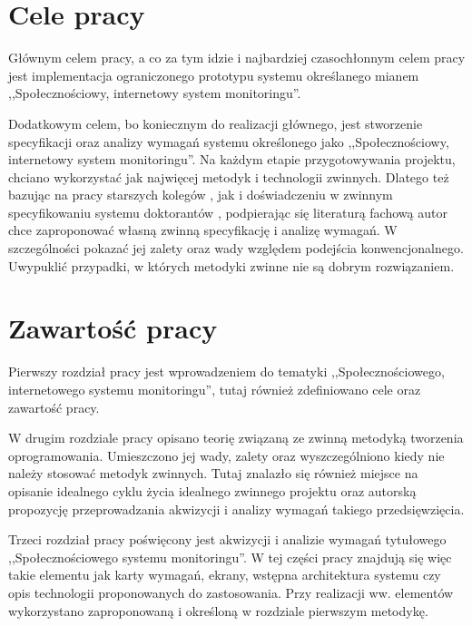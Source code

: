 \newpage

\section{Cele pracy}
\label{sec:celePracy}

Głównym celem pracy, a co za tym idzie i najbardziej czasochłonnym celem pracy jest implementacja ograniczonego prototypu systemu określanego mianem ,,Społecznościowy, internetowy system monitoringu''.

Dodatkowym celem, bo koniecznym do realizacji głównego, jest stworzenie specyfikacji oraz analizy wymagań systemu określonego jako ,,Społecznościowy, internetowy system monitoringu''. Na każdym etapie przygotowywania projektu, chciano wykorzystać jak najwięcej metodyk i technologii zwinnych. Dlatego też bazując na pracy starszych kolegów \cite{JakMich06}, jak i doświadczeniu w zwinnym specyfikowaniu systemu doktorantów \cite{Mad09}, podpierając się literaturą fachową \cite{Bec99} autor chce zaproponować własną zwinną specyfikację i analizę wymagań. W szczególności pokazać jej zalety oraz wady względem podejścia konwencjonalnego. Uwypuklić przypadki, w których metodyki zwinne nie są dobrym rozwiązaniem.

\section{Zawartość pracy}
\label{sec:zawartoscPracy}

Pierwszy rozdział pracy jest wprowadzeniem do tematyki ,,Społecznościowego, internetowego systemu monitoringu'', tutaj również zdefiniowano cele oraz zawartość pracy.

W drugim rozdziale pracy opisano teorię związaną ze zwinną metodyką tworzenia oprogramowania. Umieszczono jej wady, zalety oraz wyszczególniono kiedy nie należy stosować metodyk zwinnych. Tutaj znalazło się również miejsce na opisanie idealnego cyklu życia idealnego zwinnego projektu oraz autorską propozycję przeprowadzania akwizycji i analizy wymagań takiego przedsięwzięcia.

Trzeci rozdział pracy poświęcony jest akwizycji i analizie wymagań tytułowego ,,Społecznościowego systemu monitoringu''. W tej części pracy znajdują się więc takie elementu jak karty wymagań, ekrany, wstępna architektura systemu czy opis technologii proponowanych do zastosowania. Przy realizacji ww. elementów wykorzystano zaproponowaną i określoną w rozdziale pierwszym metodykę.

